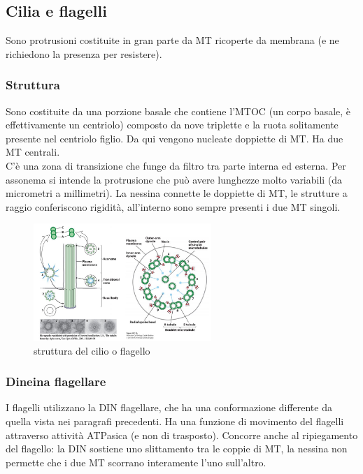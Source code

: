     \subsection{Cilia e flagelli}
        Sono protrusioni costituite in gran parte da MT ricoperte da membrana (e ne richiedono la presenza per resistere). 
        \subsubsection{Struttura}
            Sono costituite da una porzione basale che contiene l'MTOC (un corpo basale, è effettivamente un centriolo) composto da nove triplette e la ruota solitamente presente nel centriolo figlio. Da qui vengono nucleate doppiette di MT. Ha due MT centrali.\\
            C'è una zona di transizione che funge da filtro tra parte interna ed esterna.
            Per assonema si intende la protrusione che può avere lunghezze molto variabili (da micrometri a millimetri). 
            La nessina connette le doppiette di MT, le strutture a raggio conferiscono rigidità, all'interno sono sempre presenti i due MT singoli.
            \begin{figure}[h]
                \centering
                \includegraphics[width=0.6\textwidth]{images/cilia.JPG}
                \caption{\small struttura del cilio o flagello}
                \label{fig:mesh1}
            \end{figure}
        
        \subsubsection{Dineina flagellare}
            I flagelli utilizzano la DIN flagellare, che ha una conformazione differente da quella vista nei paragrafi precedenti. Ha una funzione di movimento del flagelli attraverso attività ATPasica (e non di trasposto).
            Concorre anche al ripiegamento del flagello: la DIN sostiene uno slittamento tra le coppie di MT, la nessina non permette che i due MT scorrano interamente l'uno sull'altro.
            
